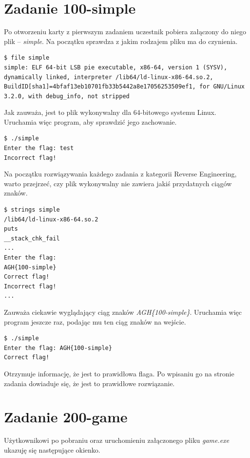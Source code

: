 \documentclass[language=polish,type=eng]{aghmodern}
\begin{document}
\section{Zadanie 100-simple}

Po otworzeniu karty z pierwszym zadaniem uczestnik pobiera załączony do niego
plik -- \emph{simple}.
Na początku sprawdza z jakim rodzajem pliku ma do czynienia.

\begin{verbatim}
$ file simple
simple: ELF 64-bit LSB pie executable, x86-64, version 1 (SYSV), dynamically linked, interpreter /lib64/ld-linux-x86-64.so.2, BuildID[sha1]=4bfaf13eb10701fb33b5442a8e17056253509ef1, for GNU/Linux 3.2.0, with debug_info, not stripped
\end{verbatim}

Jak zauważa, jest to plik wykonywalny dla 64-bitowego systemu Linux.
Uruchamia więc program, aby sprawdzić jego zachowanie.

\begin{verbatim}
$ ./simple
Enter the flag: test
Incorrect flag!
\end{verbatim}

Na początku rozwiązywania każdego zadania z kategorii Reverse Engineering, warto
przejrzeć, czy plik wykonywalny nie zawiera jakiś przydatnych ciągów znaków.

\begin{verbatim}
$ strings simple
/lib64/ld-linux-x86-64.so.2
puts
__stack_chk_fail
...
Enter the flag: 
AGH{100-simple}
Correct flag!
Incorrect flag!
...
\end{verbatim}

Zauważa ciekawie wyglądający ciąg znaków \emph{AGH\{100-simple\}}.
Uruchamia więc program jeszcze raz, podając mu ten ciąg znaków na wejście.

\begin{verbatim}
$ ./simple
Enter the flag: AGH{100-simple}
Correct flag!
\end{verbatim}

Otrzymuje informację, że jest to prawidłowa flaga.
Po wpisaniu go na stronie zadania dowiaduje się, że jest to prawidłowe rozwiązanie.

\section{Zadanie 200-game}

Użytkownikowi po pobraniu oraz uruchomieniu załączonego pliku \emph{game.exe} ukazuję
się następujące okienko.
\end{document}
